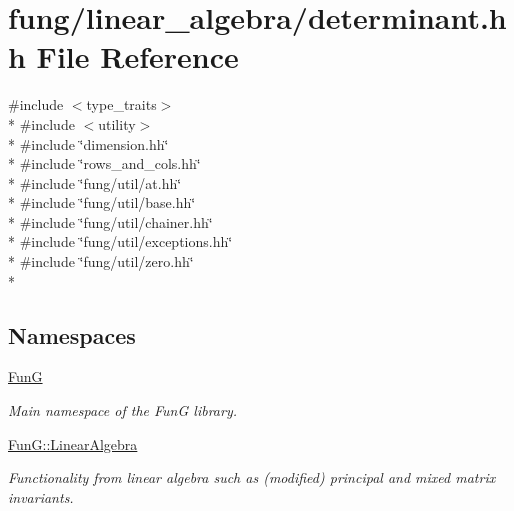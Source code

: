 \hypertarget{determinant_8hh}{}\section{fung/linear\+\_\+algebra/determinant.hh File Reference}
\label{determinant_8hh}
{\ttfamily \#include $<$type\+\_\+traits$>$}\\*
{\ttfamily \#include $<$utility$>$}\\*
{\ttfamily \#include \char`\"{}dimension.\+hh\char`\"{}}\\*
{\ttfamily \#include \char`\"{}rows\+\_\+and\+\_\+cols.\+hh\char`\"{}}\\*
{\ttfamily \#include \char`\"{}fung/util/at.\+hh\char`\"{}}\\*
{\ttfamily \#include \char`\"{}fung/util/base.\+hh\char`\"{}}\\*
{\ttfamily \#include \char`\"{}fung/util/chainer.\+hh\char`\"{}}\\*
{\ttfamily \#include \char`\"{}fung/util/exceptions.\+hh\char`\"{}}\\*
{\ttfamily \#include \char`\"{}fung/util/zero.\+hh\char`\"{}}\\*
\subsection*{Namespaces}
\begin{DoxyCompactItemize}
\item 
 \hyperlink{namespaceFunG}{Fun\+G}
\begin{DoxyCompactList}\small\item\em Main namespace of the Fun\+G library. \end{DoxyCompactList}\item 
 \hyperlink{namespaceFunG_1_1LinearAlgebra}{Fun\+G\+::\+Linear\+Algebra}
\begin{DoxyCompactList}\small\item\em Functionality from linear algebra such as (modified) principal and mixed matrix invariants. \end{DoxyCompactList}\end{DoxyCompactItemize}
